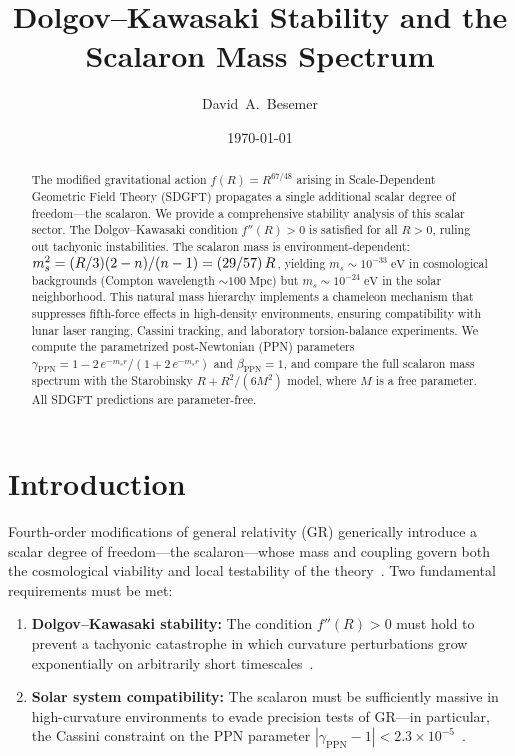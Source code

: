 \documentclass[amsmath,amssymb,aps,prd,twocolumn,superscriptaddress,nofootinbib]{revtex4-2}
\begin{document}

\title{Dolgov--Kawasaki Stability and the Scalaron Mass Spectrum}

\author{David~A.~Besemer}

\date{\today}

\begin{abstract}
The modified gravitational action $f(R) = R^{67/48}$ arising in
Scale-Dependent Geometric Field Theory (SDGFT) propagates a single
additional scalar degree of freedom---the scalaron.  We provide a
comprehensive stability analysis of this scalar sector.  The
Dolgov--Kawasaki condition $f''(R) > 0$ is satisfied for all
$R > 0$, ruling out tachyonic instabilities.  The scalaron mass is
environment-dependent:
$m_s^2 = (R/3)(2 - n)/(n - 1) = (29/57)\,R$, yielding
$m_s \sim 10^{-33}\;\mathrm{eV}$ in cosmological backgrounds
(Compton wavelength $\sim 100\;\mathrm{Mpc}$) but
$m_s \sim 10^{-24}\;\mathrm{eV}$ in the solar neighborhood.
This natural mass hierarchy implements a chameleon mechanism
that suppresses fifth-force effects in high-density environments,
ensuring compatibility with lunar laser ranging, Cassini tracking,
and laboratory torsion-balance experiments.  We compute the
parametrized post-Newtonian (PPN) parameters
$\gamma_{\mathrm{PPN}} = 1 - 2\,e^{-m_s r}/(1 + 2\,e^{-m_s r})$
and $\beta_{\mathrm{PPN}} = 1$, and compare the full scalaron
mass spectrum with the Starobinsky $R + R^2/(6M^2)$ model, where
$M$ is a free parameter.  All SDGFT predictions are parameter-free.
\end{abstract}

\maketitle

\section{Introduction}
\label{sec:intro}

Fourth-order modifications of general relativity (GR) generically
introduce a scalar degree of freedom---the scalaron---whose mass
and coupling govern both the cosmological viability and local
testability of the theory~\cite{Sotiriou2010,DeFelice2010}.
Two fundamental requirements must be met:

\begin{enumerate}
  \item \textbf{Dolgov--Kawasaki stability:} The condition
    $f''(R) > 0$ must hold to prevent a tachyonic catastrophe
    in which curvature perturbations grow exponentially on
    arbitrarily short timescales~\cite{Dolgov2003}.

  \item \textbf{Solar system compatibility:} The scalaron must
    be sufficiently massive in high-curvature environments to
    evade precision tests of GR---in particular, the Cassini
    constraint on the PPN parameter
    $|\gamma_{\mathrm{PPN}} - 1| < 2.3 \times
    10^{-5}$~\cite{Bertotti2003}.
\end{enumerate}
\end{document}
